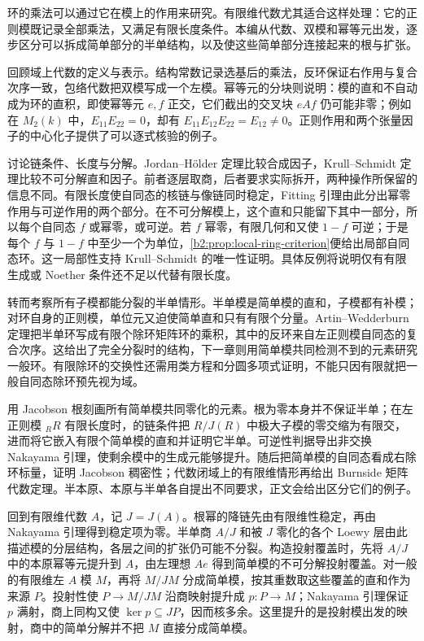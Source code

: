 
\BookPartGuide
环的乘法可以通过它在模上的作用来研究。有限维代数尤其适合这样处理：它的正则模既记录全部乘法，又满足有限长度条件。本编从代数、双模和幂等元出发，逐步区分可以拆成简单部分的半单结构，以及使这些简单部分连接起来的根与扩张。

\ProseParagraphBreak
{}回顾域上代数的定义与表示。结构常数记录选基后的乘法，反环保证右作用与复合次序一致，包络代数把双模写成一个左模。幂等元的分块则说明：模的直和不自动成为环的直积，即使幂等元 \(e,f\) 正交，它们截出的交叉块 \(eAf\) 仍可能非零；例如在 \(M_2(k)\) 中，\(E_{11}E_{22}=0\)，却有 \(E_{11}E_{12}E_{22}=E_{12}\ne0\)。正则作用和两个张量因子的中心化子提供了可以逐式核验的例子。

\ProseParagraphBreak
{}讨论链条件、长度与分解。Jordan--Hölder 定理比较合成因子，Krull--Schmidt 定理比较不可分解直和因子。前者逐层取商，后者要求实际拆开，两种操作所保留的信息不同。有限长度使自同态的核链与像链同时稳定，Fitting 引理由此分出幂零作用与可逆作用的两个部分。在不可分解模上，这个直和只能留下其中一部分，所以每个自同态 \(f\) 或幂零，或可逆。若 \(f\) 幂零，有限几何和又使 \(1-f\) 可逆；于是每个 \(f\) 与 \(1-f\) 中至少一个为单位，\cref{b2:prop:local-ring-criterion}便给出局部自同态环。这一局部性支持 Krull--Schmidt 的唯一性证明。具体反例将说明仅有有限生成或 Noether 条件还不足以代替有限长度。

\ProseParagraphBreak
{}转而考察所有子模都能分裂的半单情形。半单模是简单模的直和，子模都有补模；对环自身的正则模，单位元又迫使简单直和只有有限个分量。Artin--Wedderburn 定理把半单环写成有限个除环矩阵环的乘积，其中的反环来自左正则模自同态的复合次序。这给出了完全分裂时的结构，下一章则用简单模共同检测不到的元素研究一般环。有限除环的交换性还需用类方程和分圆多项式证明，不能只因有限就把一般自同态除环预先视为域。

\ProseParagraphBreak
{}用 Jacobson 根刻画所有简单模共同零化的元素。根为零本身并不保证半单；在左正则模 \({}_RR\) 有限长度时，的链条件把 \(R/J(R)\) 中极大子模的零交缩为有限交，进而将它嵌入有限个简单模的直和并证明它半单。可逆性判据导出非交换 Nakayama 引理，使剩余模中的生成元能够提升。随后把简单模的自同态看成右除环标量，证明 Jacobson 稠密性；代数闭域上的有限维情形再给出 Burnside 矩阵代数定理。半本原、本原与半单各自提出不同要求，正文会给出区分它们的例子。

\ProseParagraphBreak
{}回到有限维代数 \(A\)，记 \(J=J(A)\)。根幂的降链先由有限维性稳定，再由 Nakayama 引理得到稳定项为零。半单商 \(A/J\) 和被 \(J\) 零化的各个 Loewy 层由此描述模的分层结构，各层之间的扩张仍可能不分裂。构造投射覆盖时，先将 \(A/J\) 中的本原幂等元提升到 \(A\)，由左理想 \(Ae\) 得到简单模的不可分解投射覆盖。对一般的有限维左 \(A\) 模 \(M\)，再将 \(M/JM\) 分成简单模，按其重数取这些覆盖的直和作为来源 \(P\)。投射性使 \(P\to M/JM\) 沿商映射提升成 \(p:P\to M\)；Nakayama 引理保证 \(p\) 满射，商上同构又使 \(\ker p\subseteq JP\)，因而核多余。这里提升的是投射模出发的映射，商中的简单分解并不把 \(M\) 直接分成简单模。

